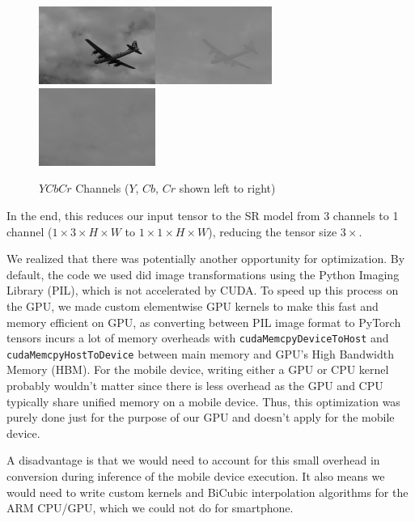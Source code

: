 \documentclass{article}
\begin{document}
\begin{figure}
    \centerline{\includegraphics[width=1.5in]{../final/figures/y_img.png}\includegraphics[width=1.5in]{../final/figures/cb_img.png}\includegraphics[width=1.5in]{../final/figures/cr_img.png}}
    \caption{$YCbCr$ Channels ($Y$, $Cb$, $Cr$ shown left to right)}
    \label{fig:ycbcr}
\end{figure}

In the end, this reduces our input tensor to the SR model from 3 channels to 1 channel ($1 \times 3 \times H \times W$ to $1 \times 1 \times H \times W$), reducing the tensor size $3\times$. 


We realized that there was potentially another opportunity for optimization. By default, the code we used did image transformations using the Python Imaging Library (PIL), which is not accelerated by CUDA. To speed up this process on the GPU, we made custom elementwise GPU kernels to make this fast and memory efficient on GPU, as converting between PIL image format to PyTorch tensors incurs a lot of memory overheads with \verb|cudaMemcpyDeviceToHost| and \verb|cudaMemcpyHostToDevice| between main memory and GPU's High Bandwidth Memory (HBM). For the mobile device, writing either a GPU or CPU kernel probably wouldn't matter since there is less overhead as the GPU and CPU typically share unified memory on a mobile device. Thus, this optimization was purely done just for the purpose of our GPU and doesn't apply for the mobile device. 

A disadvantage is that we would need to account for this small overhead in conversion during inference of the mobile device execution. It also means we would need to write custom kernels and BiCubic interpolation algorithms for the ARM CPU/GPU, which we could not do for smartphone.
\end{document}
